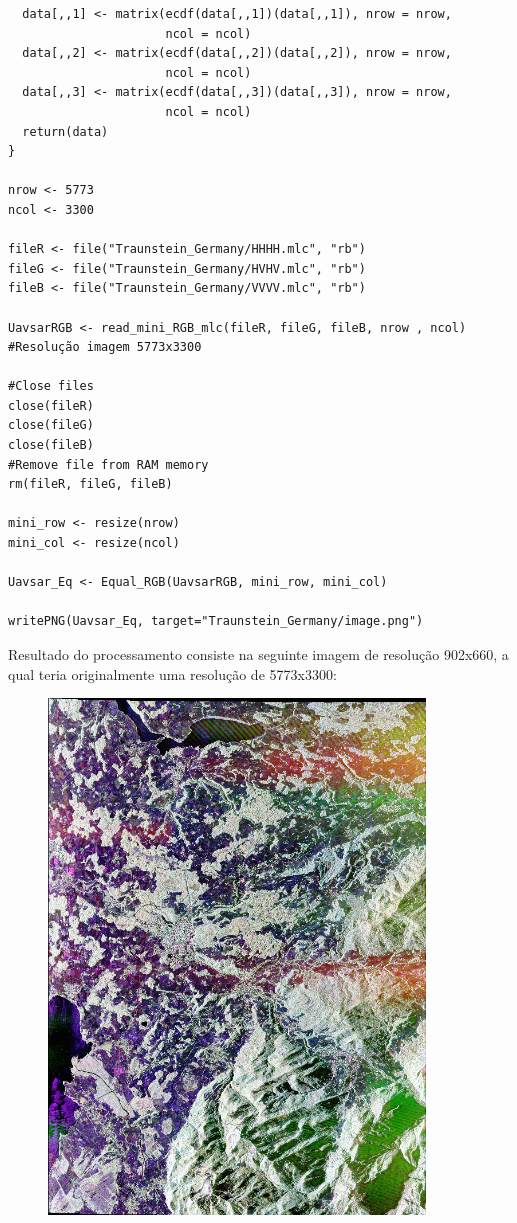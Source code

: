 \documentclass[12pt]{article}
\begin{document}
\begin{verbatim}
  data[,,1] <- matrix(ecdf(data[,,1])(data[,,1]), nrow = nrow,
                      ncol = ncol)
  data[,,2] <- matrix(ecdf(data[,,2])(data[,,2]), nrow = nrow,
                      ncol = ncol)
  data[,,3] <- matrix(ecdf(data[,,3])(data[,,3]), nrow = nrow,
                      ncol = ncol)  
  return(data)
}

nrow <- 5773
ncol <- 3300

fileR <- file("Traunstein_Germany/HHHH.mlc", "rb")
fileG <- file("Traunstein_Germany/HVHV.mlc", "rb")
fileB <- file("Traunstein_Germany/VVVV.mlc", "rb")

UavsarRGB <- read_mini_RGB_mlc(fileR, fileG, fileB, nrow , ncol) #Resolução imagem 5773x3300

#Close files
close(fileR)
close(fileG)
close(fileB)
#Remove file from RAM memory
rm(fileR, fileG, fileB)

mini_row <- resize(nrow)
mini_col <- resize(ncol)

Uavsar_Eq <- Equal_RGB(UavsarRGB, mini_row, mini_col)

writePNG(Uavsar_Eq, target="Traunstein_Germany/image.png")

\end{verbatim}

Resultado do processamento consiste na seguinte imagem de resolução 902x660, a qual teria originalmente uma resolução de 5773x3300:

\begin{figure}[!ht]
	\begin{center}
		\includegraphics[width = 100mm, scale = 0.5]{../../Images/Report_05_18/traunstein_05_18}
	\end{center}
\end{figure}
\end{document}
